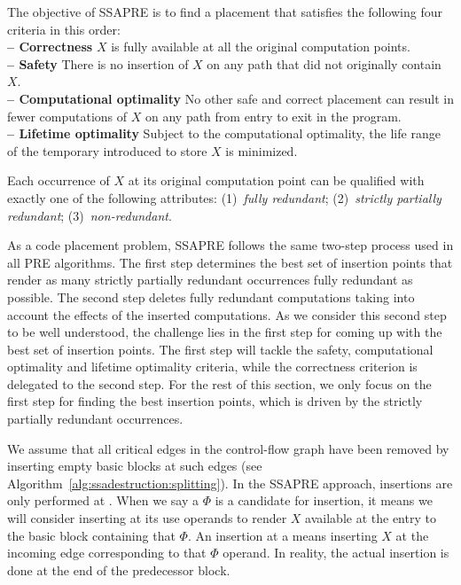 The objective of SSAPRE is to find a placement that satisfies the following four criteria in this order:\\
\textbf{-- Correctness} $X$ is fully available at all the original computation points.\\
\textbf{-- Safety} There is no insertion of $X$ on any path that did not originally contain $X$.\\
\textbf{-- Computational optimality} No other safe and correct placement can result in fewer computations of $X$ on any path from entry to exit in the program.\\
\textbf{-- Lifetime optimality} Subject to the computational optimality, the life range of the temporary introduced to store $X$ is minimized.

Each occurrence of $X$ at its original computation point can be qualified
with exactly one of the following attributes:
(1)~\emph{fully redundant};
(2)~\emph{strictly partially redundant};
(3)~\emph{non-redundant}.

As a code placement problem, SSAPRE follows the same two-step process used in all PRE algorithms. 
The first step determines the best set of insertion points that render as many strictly partially redundant occurrences fully redundant as possible. 
The second step deletes fully redundant computations taking into account the effects of the inserted computations. 
As we consider this second step to be well understood, the challenge lies in the first step for coming up with the best set of insertion points. 
The first step will tackle the safety, computational optimality and lifetime optimality criteria, while the correctness criterion is delegated to the second step. 
For the rest of this section, we only focus on the first step for finding the best insertion points, which is driven by the strictly partially redundant occurrences.

We assume that all critical edges in the control-flow graph have been removed by inserting empty basic blocks at such edges (see Algorithm~\ref{alg:ssadestruction:splitting}).
In the SSAPRE approach, insertions are only performed at \PHIuses.
When we say a $\Phi$ is a candidate for insertion, it means we will consider inserting at its use operands to render $X$ available at the entry to the basic block containing that $\Phi$. 
An insertion at a \PHIuse means inserting $X$ at the incoming edge corresponding to that $\Phi$ operand. 
In reality, the actual insertion is done at the end of the predecessor block.

